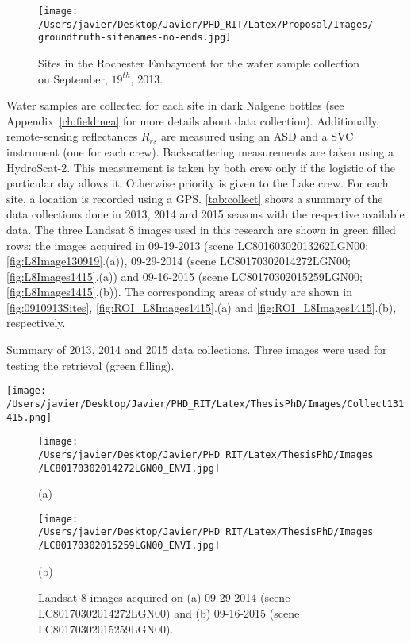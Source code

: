 \begin{figure}[htb]
  \centering
  \texttt{[image: /Users/javier/Desktop/Javier/PHD\_RIT/Latex/Proposal/Images/groundtruth-sitenames-no-ends.jpg]}
  \caption{Sites in the Rochester Embayment for the water sample collection on September, $19^{th}$, 2013.\label{fig:0910913Sites} } 
\end{figure}

Water samples are collected for each site in dark Nalgene bottles (see Appendix~\ref{ch:fieldmea} for more details about data collection). Additionally, remote-sensing reflectances $R_{rs}$ are measured using an ASD and a SVC instrument (one for each crew). Backscattering measurements are taken using a HydroScat-2. This measurement is taken by both crew only if the logistic of the particular day allows it. Otherwise priority is given to the Lake crew. For each site, a location is recorded using a GPS. \autoref{tab:collect} shows a summary of the data collections done in 2013, 2014 and 2015 seasons with the respective available data.  The three Landsat 8 images used in this research are shown in green filled rows: the images acquired in 09-19-2013 (scene LC80160302013262LGN00; \autoref{fig:L8Image130919}.(a)), 09-29-2014 (scene LC80170302014272LGN00; \autoref{fig:L8Images1415}.(a)) and 09-16-2015 (scene LC80170302015259LGN00; \autoref{fig:L8Images1415}.(b)). The corresponding areas of study are shown in \autoref{fig:0910913Sites}, \autoref{fig:ROI_L8Images1415}.(a) and \autoref{fig:ROI_L8Images1415}.(b), respectively.

\begin{table}[htb]
  \caption{Summary of 2013, 2014 and 2015 data collections. Three images were used for testing the retrieval (green filling).}
  \centering
  \texttt{[image: /Users/javier/Desktop/Javier/PHD\_RIT/Latex/ThesisPhD/Images/Collect131415.png]}
  \label{tab:collect}
\end{table}

\begin{figure}[htb]
    \begin{minipage}[c]{0.48\linewidth}
      \centering
      \texttt{[image: /Users/javier/Desktop/Javier/PHD\_RIT/Latex/ThesisPhD/Images/LC80170302014272LGN00\_ENVI.jpg]}
      \centerline{(a)}\medskip
    \end{minipage}
    \hfill
    \begin{minipage}[d]{0.48\linewidth}
      \centering
      \texttt{[image: /Users/javier/Desktop/Javier/PHD\_RIT/Latex/ThesisPhD/Images/LC80170302015259LGN00\_ENVI.jpg]}
      \centerline{(b)}\medskip
    \end{minipage} 
      \caption{Landsat 8 images acquired on (a) 09-29-2014 (scene LC80170302014272LGN00) and (b) 09-16-2015 (scene LC80170302015259LGN00). \label{fig:L8Images1415} }
\end{figure}  

